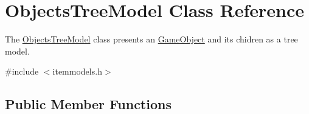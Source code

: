 \hypertarget{class_objects_tree_model}{\section{\-Objects\-Tree\-Model \-Class \-Reference}
\label{class_objects_tree_model}
}


\-The \hyperlink{class_objects_tree_model}{\-Objects\-Tree\-Model} class presents an \hyperlink{class_game_object}{\-Game\-Object} and its chidren as a tree model.  




{\ttfamily \#include $<$itemmodels.\-h$>$}

\subsection*{\-Public \-Member \-Functions}
